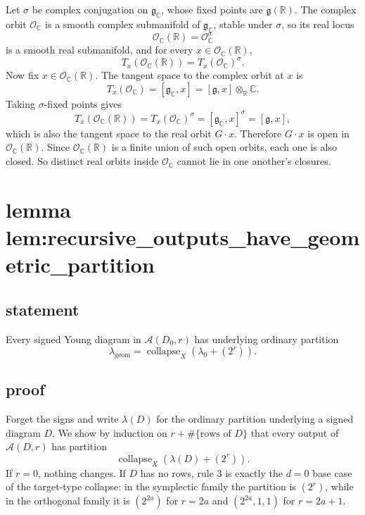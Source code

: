 \documentclass[
]{article}
\begin{document}
Let \(\sigma\) be complex conjugation on \(\mathfrak g_{\mathbb C}\),
whose fixed points are \(\mathfrak g(\mathbb R)\). The complex orbit
\(\mathcal O_{\mathbb C}\) is a smooth complex submanifold of
\(\mathfrak g_{\mathbb C}\), stable under \(\sigma\), so its real locus
\[
\mathcal O_{\mathbb C}(\mathbb R)=\mathcal O_{\mathbb C}^{\sigma}
\] is a smooth real submanifold, and for every
\(x\in \mathcal O_{\mathbb C}(\mathbb R)\), \[
T_x(\mathcal O_{\mathbb C}(\mathbb R))=T_x(\mathcal O_{\mathbb C})^{\sigma}.
\] Now fix \(x\in \mathcal O_{\mathbb C}(\mathbb R)\). The tangent space
to the complex orbit at \(x\) is \[
T_x(\mathcal O_{\mathbb C})=[\mathfrak g_{\mathbb C},x]=[\mathfrak g,x]\otimes_{\mathbb R}\mathbb C.
\] Taking \(\sigma\)-fixed points gives \[
T_x(\mathcal O_{\mathbb C}(\mathbb R))
=T_x(\mathcal O_{\mathbb C})^{\sigma}
=[\mathfrak g_{\mathbb C},x]^{\sigma}
=[\mathfrak g,x],
\] which is also the tangent space to the real orbit \(G\cdot x\).
Therefore \(G\cdot x\) is open in \(\mathcal O_{\mathbb C}(\mathbb R)\).
Since \(\mathcal O_{\mathbb C}(\mathbb R)\) is a finite union of such
open orbits, each one is also closed. So distinct real orbits inside
\(\mathcal O_{\mathbb C}\) cannot lie in one another's closures.

\section{lemma
lem:recursive\_outputs\_have\_geometric\_partition}\label{lemma-lemrecursive_outputs_have_geometric_partition}

\subsection{statement}\label{statement-20}

Every signed Young diagram in \(\mathcal A(D_0,r)\) has underlying
ordinary partition \[
\lambda_{\mathrm{geom}}=\operatorname{collapse}_X(\lambda_0+(2^r)).
\]

\subsection{proof}\label{proof-20}

Forget the signs and write \(\lambda(D)\) for the ordinary partition
underlying a signed diagram \(D\). We show by induction on
\(r+\#\{\text{rows of }D\}\) that every output of \(\mathcal A(D,r)\)
has partition \[
\operatorname{collapse}_X(\lambda(D)+(2^r)).
\] If \(r=0\), nothing changes. If \(D\) has no rows, rule \(3\) is
exactly the \(d=0\) base case of the target-type collapse: in the
symplectic family the partition is \((2^r)\), while in the orthogonal
family it is \((2^{2a})\) for \(r=2a\) and \((2^{2a},1,1)\) for
\(r=2a+1\).
\end{document}
